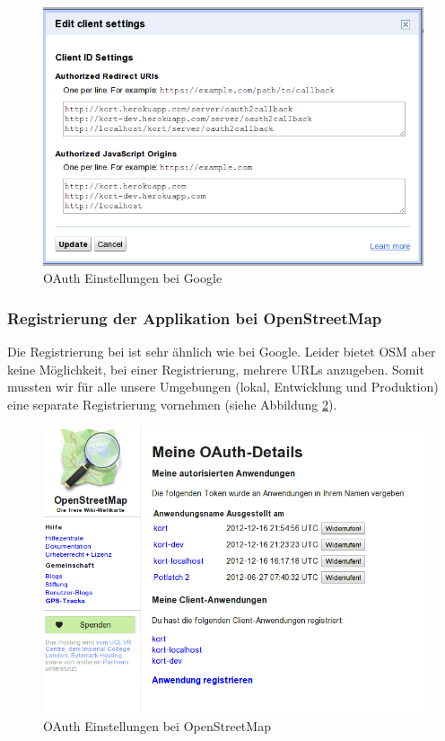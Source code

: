 \begin{figure}[H]
	\centering
	\includegraphics[scale=0.5]{images/implementation/backend/oauth-google-settings}
	\caption{OAuth Einstellungen bei Google}
	\label{image-oauth-google-settings}
\end{figure}

\subsubsection{Registrierung der Applikation bei OpenStreetMap}
Die Registrierung bei  ist sehr ähnlich wie bei Google.
Leider bietet OSM aber keine Möglichkeit, bei einer Registrierung, mehrere URLs anzugeben.
Somit mussten wir für alle unsere Umgebungen (lokal, Entwicklung und Produktion) eine separate Registrierung vornehmen (siehe Abbildung \ref{image-oauth-osm}).

\begin{figure}[H]
	\centering
	\includegraphics[scale=0.5]{images/implementation/backend/oauth-osm}
	\caption{OAuth Einstellungen bei OpenStreetMap}
	\label{image-oauth-osm}
\end{figure}

